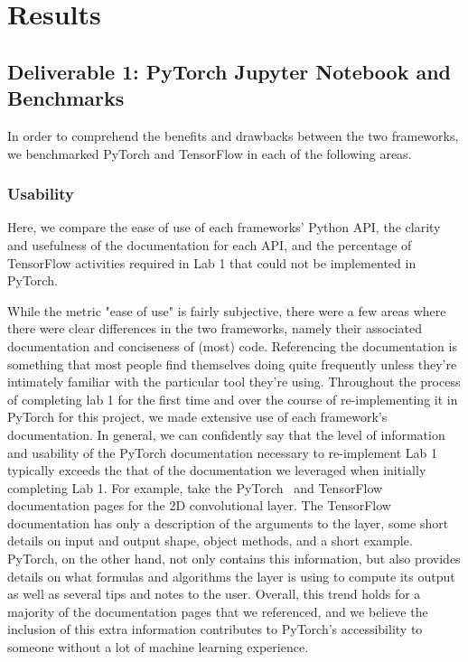 \documentclass[letterpaper,twocolumn,10pt]{article}
\begin{document}
\section{Results}

\subsection{Deliverable 1: PyTorch Jupyter Notebook and Benchmarks}
In order to comprehend the benefits and drawbacks between the two frameworks, we benchmarked PyTorch and TensorFlow in each of the following areas.

\subsubsection{Usability}
Here, we compare the ease of use of each frameworks' Python API, the clarity and usefulness of the documentation for each API, and the percentage of TensorFlow activities required in Lab 1 that could not be implemented in PyTorch.

While the metric "ease of use" is fairly subjective, there were a few areas where there were clear differences in the two frameworks, namely their associated documentation and conciseness of (most) code. Referencing the documentation is something that most people find themselves doing quite frequently unless they're intimately familiar with the particular tool they're using. Throughout the process of completing lab 1 for the first time and over the course of re-implementing it in PyTorch for this project, we made extensive use of each framework's documentation. In general, we can confidently say that the level of information and usability of the PyTorch documentation necessary to re-implement Lab 1 typically exceeds the that of the documentation we leveraged when initially completing Lab 1. For example, take the PyTorch~\cite{convtorch} and TensorFlow~\cite{convtensor} documentation pages for the 2D convolutional layer. The TensorFlow documentation has only a description of the arguments to the layer, some short details on input and output shape, object methods, and a short example. PyTorch, on the other hand, not only contains this information, but also provides details on what formulas and algorithms the layer is using to compute its output as well as several tips and notes to the user. Overall, this trend holds for a majority of the documentation pages that we referenced, and we believe the inclusion of this extra information contributes to PyTorch's accessibility to someone without a lot of machine learning experience.
\end{document}
